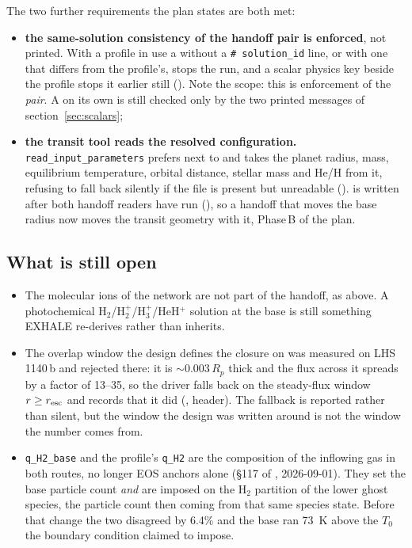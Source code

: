 \documentclass[english,a4paper]{my_memo}
\begin{document}
The two further requirements the plan states are both met:

\begin{itemize}
\item \textbf{the same-solution consistency of the handoff pair is
  enforced}, not printed. With a profile in use a  without a
  \verb|# solution_id| line, or with one that differs from the profile's,
  stops the run, and a scalar physics key beside the profile stops it
  earlier still (). Note the scope:
  this is enforcement of the \emph{pair}. A  on its own is
  still checked only by the two printed messages of
  section~\ref{sec:scalars};
\item \textbf{the transit tool reads the resolved configuration.}
  \verb|read_input_parameters| prefers  next to
   and takes the planet radius, mass, equilibrium
  temperature, orbital distance, stellar mass and He/H from it, refusing to
  fall back silently if the file is present but unreadable
  ().  is
  written after both handoff readers have run
  (), so a handoff
  that moves the base radius now moves the transit geometry with it,
  Phase\,B of the plan.
\end{itemize}

\subsection{What is still open}

\begin{itemize}
\item The molecular ions of the network are not part of the handoff, as
  above. A photochemical H$_2$/H$_2^+$/H$_3^+$/HeH$^+$ solution at the base
  is still something EXHALE re-derives rather than inherits.
\item The overlap window the design defines the closure on was measured on
  LHS\,1140\,b and rejected there: it is $\sim\!0.003\,R_p$ thick and the
  flux across it spreads by a factor of 13--35, so the driver falls back on
  the steady-flux window $r \ge r_{\rm esc}$ and records that it did
  (, header). The fallback is
  reported rather than silent, but the window the design was written around
  is not the window the number comes from.
\item \verb|q_H2_base| and the profile's \verb|q_H2| are the composition of
  the inflowing gas in both routes, no longer EOS anchors alone (\S117 of
  , 2026-09-01). They set the base particle
  count \emph{and} are imposed on the H$_2$ partition of the lower ghost
  species, the particle count then coming from that same species state.
  Before that change the two disagreed by 6.4\% and the base ran 73~K above
  the $T_0$ the boundary condition claimed to impose.
\end{itemize}
\end{document}
